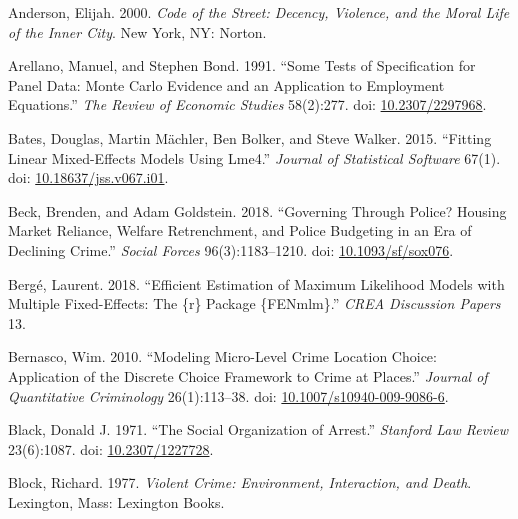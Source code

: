 \documentclass [11pt, proquest] {uwthesis}[2015/03/03]
\newlength{\cslhangindent}
\newenvironment{CSLReferences}[2]%
{\setlength{\parindent}{0pt}%
\everypar{\setlength{\hangindent}{\cslhangindent}}\ignorespaces}%
{\par}
\begin{document}
\hypertarget{refs}{}
\begin{CSLReferences}{1}{0}
\leavevmode\hypertarget{ref-andersonCodeStreetDecency2000}{}%
Anderson, Elijah. 2000. \emph{Code of the Street: Decency, Violence, and the Moral Life of the Inner City}. {New York, NY}: {Norton}.

\leavevmode\hypertarget{ref-arellanoTestsSpecificationPanel1991}{}%
Arellano, Manuel, and Stephen Bond. 1991. {``Some {Tests} of {Specification} for {Panel Data}: {Monte Carlo Evidence} and an {Application} to {Employment Equations}.''} \emph{The Review of Economic Studies} 58(2):277. doi: \href{https://doi.org/10.2307/2297968}{10.2307/2297968}.

\leavevmode\hypertarget{ref-batesFittingLinearMixedEffects2015}{}%
Bates, Douglas, Martin Mächler, Ben Bolker, and Steve Walker. 2015. {``Fitting {Linear Mixed}-{Effects Models Using} Lme4.''} \emph{Journal of Statistical Software} 67(1). doi: \href{https://doi.org/10.18637/jss.v067.i01}{10.18637/jss.v067.i01}.

\leavevmode\hypertarget{ref-beckGoverningPoliceHousing2018}{}%
Beck, Brenden, and Adam Goldstein. 2018. {``Governing {Through Police}? {Housing Market Reliance}, {Welfare Retrenchment}, and {Police Budgeting} in an {Era} of {Declining Crime}.''} \emph{Social Forces} 96(3):1183--1210. doi: \href{https://doi.org/10.1093/sf/sox076}{10.1093/sf/sox076}.

\leavevmode\hypertarget{ref-bergeEfficientEstimationMaximum2018}{}%
Bergé, Laurent. 2018. {``Efficient Estimation of Maximum Likelihood Models with Multiple Fixed-Effects: The \{r\} Package \{FENmlm\}.''} \emph{CREA Discussion Papers} 13.

\leavevmode\hypertarget{ref-bernascoModelingMicroLevelCrime2010}{}%
Bernasco, Wim. 2010. {``Modeling {Micro}-{Level Crime Location Choice}: {Application} of the {Discrete Choice Framework} to {Crime} at {Places}.''} \emph{Journal of Quantitative Criminology} 26(1):113--38. doi: \href{https://doi.org/10.1007/s10940-009-9086-6}{10.1007/s10940-009-9086-6}.

\leavevmode\hypertarget{ref-blackSocialOrganizationArrest1971}{}%
Black, Donald J. 1971. {``The {Social Organization} of {Arrest}.''} \emph{Stanford Law Review} 23(6):1087. doi: \href{https://doi.org/10.2307/1227728}{10.2307/1227728}.

\leavevmode\hypertarget{ref-blockViolentCrimeEnvironment1977}{}%
Block, Richard. 1977. \emph{Violent Crime: Environment, Interaction, and Death}. {Lexington, Mass}: {Lexington Books}.


\end{CSLReferences}
\end{document}
